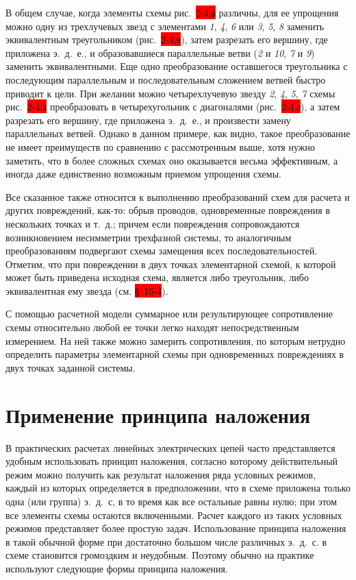 В общем случае, когда элементы схемы рис.~\colorbox{red}{2-4,а} различны, для ее упрощения можно одну из трехлучевых звезд с элементами \textit{1}, \textit{4}, \textit{6} или \textit{3}, \textit{5}, \textit{8} заменить эквивалентным треугольником (рис.~\colorbox{red}{2-4,в}), затем разрезать его вершину, где приложена э.~д.~е., и образовавшиеся параллельные ветви (\textit{2} и \textit{10}, \textit{7} и \textit{9}) заменить эквивалентными. Еще одно преобразование оставшегося треугольника с последующим параллельным и последовательным сложением ветвей быстро приводит к цели. При желании можно четырехлучевую звезду \textit{2}, \textit{4}, \textit{5}, \textit{7} схемы рис.~\colorbox{red}{2-4,а} преобразовать в четырехугольник с диагоналями (рис.~\colorbox{red}{2-4,\textit{г}}), а затем разрезать его вершину, где приложена э.~д.~е., и произвести замену параллельных ветвей. Однако в данном примере, как видно, такое преобразование не имеет преимуществ по сравнению с рассмотренным выше, хотя нужно заметить, что в более сложных схемах оно оказывается весьма эффективным, а иногда даже единственно возможным приемом упрощения схемы.

Все сказанное также относится к выполнению преобразований схем для расчета и других повреждений, как-то: обрыв проводов, одновременные повреждения в нескольких точках и т.~д.; причем если повреждения сопровождаются возникновением несимметрии трехфазной системы, то аналогичным преобразованиям подвергают схемы замещения всех последовательностей. Отметим, что при повреждении в двух точках элементарной схемой, к которой может быть приведена исходная схема, является либо треугольник, либо эквивалентная ему звезда (см. \colorbox{red}{§~16-4}).

С помощью расчетной модели суммарное или результирующее сопротивление схемы относительно любой ее точки легко находят непосредственным измерением. На ней также можно замерить сопротивления, по которым нетрудно определить параметры элементарной схемы при одновременных повреждениях в двух точках заданной системы.

\section{Применение принципа наложения}
\label{sec:2-6 primenenie_printcipa_nalozheniia}

В практических расчетах линейных электрических цепей часто представляется удобным использовать принцип наложения, согласно которому действительный режим можно получить как результат наложения ряда условных режимов, каждый из которых определяется в предположении, что в схеме приложена только одна (или группа) э.~д.~с, в то время как все остальные равны нулю; при этом все элементы схемы остаются включенными. Расчет каждого из таких условных режимов представляет более простую задач. Использование принципа наложения в такой обычной форме при достаточно большом числе различных э.~д.~с. в схеме становится громоздким и неудобным. Поэтому обычно на практике используют следующие формы принципа наложения.

